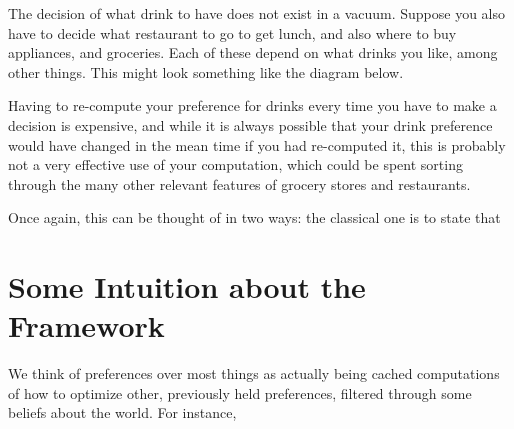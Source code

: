 \documentclass{article}
\theoremstyle{plain}
\theoremstyle{definition}
\theoremstyle{remark}
\begin{document}
	The decision of what drink to have does not exist in a vacuum. Suppose you also have to decide what restaurant to go to get lunch, and also where to buy appliances, and groceries. Each of these depend on what drinks you like, among other things. This might look something like the diagram below.
	\begin{center}
	\end{center}
	Having to re-compute your preference for drinks every time you have to make a decision is expensive, and while it is always possible that your drink preference would have changed in the mean time if you had re-computed it, this is probably not a very effective use of your computation, which could be spent sorting through the many other relevant features of grocery stores and restaurants. 
	
	Once again, this can be thought of in two ways: the classical one is to state that 
	

	\section{Some Intuition about the Framework}
	We think of preferences over most things as actually being cached computations of how to optimize other, previously held preferences, filtered through some beliefs about the world. For instance, 
	
\end{document}
